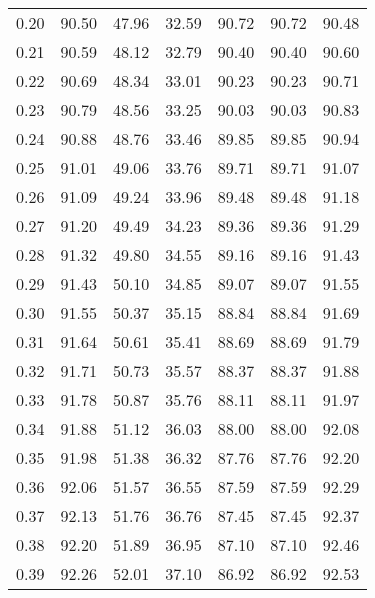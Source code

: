 \begin{tabular}{|c|c|c|c|c|c|c|}
      0.20 &     90.50 &     47.96 &      32.59 &   90.72 &      90.72 &         90.48 \\
      0.21 &     90.59 &     48.12 &      32.79 &   90.40 &      90.40 &         90.60 \\
      0.22 &     90.69 &     48.34 &      33.01 &   90.23 &      90.23 &         90.71 \\
      0.23 &     90.79 &     48.56 &      33.25 &   90.03 &      90.03 &         90.83 \\
      0.24 &     90.88 &     48.76 &      33.46 &   89.85 &      89.85 &         90.94 \\
      0.25 &     91.01 &     49.06 &      33.76 &   89.71 &      89.71 &         91.07 \\
      0.26 &     91.09 &     49.24 &      33.96 &   89.48 &      89.48 &         91.18 \\
      0.27 &     91.20 &     49.49 &      34.23 &   89.36 &      89.36 &         91.29 \\
      0.28 &     91.32 &     49.80 &      34.55 &   89.16 &      89.16 &         91.43 \\
      0.29 &     91.43 &     50.10 &      34.85 &   89.07 &      89.07 &         91.55 \\
      0.30 &     91.55 &     50.37 &      35.15 &   88.84 &      88.84 &         91.69 \\
      0.31 &     91.64 &     50.61 &      35.41 &   88.69 &      88.69 &         91.79 \\
      0.32 &     91.71 &     50.73 &      35.57 &   88.37 &      88.37 &         91.88 \\
      0.33 &     91.78 &     50.87 &      35.76 &   88.11 &      88.11 &         91.97 \\
      0.34 &     91.88 &     51.12 &      36.03 &   88.00 &      88.00 &         92.08 \\
      0.35 &     91.98 &     51.38 &      36.32 &   87.76 &      87.76 &         92.20 \\
      0.36 &     92.06 &     51.57 &      36.55 &   87.59 &      87.59 &         92.29 \\
      0.37 &     92.13 &     51.76 &      36.76 &   87.45 &      87.45 &         92.37 \\
      0.38 &     92.20 &     51.89 &      36.95 &   87.10 &      87.10 &         92.46 \\
      0.39 &     92.26 &     52.01 &      37.10 &   86.92 &      86.92 &         92.53 \\

\end{tabular}

